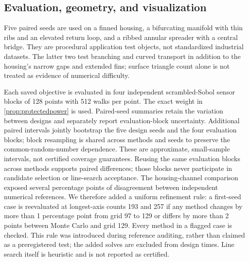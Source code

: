 \subsection{Evaluation, geometry, and visualization}
Five paired seeds are used on a finned housing, a bifurcating manifold with
thin ribs and an elevated return loop, and a ribbed annular spreader with a
central bridge. They are procedural application test objects, not standardized
industrial datasets. The latter two test branching and curved transport in
addition to the housing's narrow gaps and extended fins; surface triangle count
alone is not treated as evidence of numerical difficulty.

Each saved objective is evaluated in four independent scrambled-Sobol sensor
blocks of 128 points with 512 walks per point. The exact weight in
\cref{prop:protectedpower} is used. Paired-seed summaries retain the variation
between designs and separately report evaluation-block uncertainty. Additional
paired intervals jointly bootstrap the five design seeds and the four evaluation
blocks; block resampling is shared across methods and seeds to preserve the
common-random-number dependence. These are approximate, small-sample intervals,
not certified coverage guarantees. Reusing
the same evaluation blocks across methods supports paired differences; those
blocks never participate in candidate selection or line-search acceptance.
The housing-channel comparison exposed several percentage points of disagreement
between independent numerical references. We therefore added a uniform refinement
rule: a first-seed case is reevaluated at longest-axis counts 193 and 257 if any
method changes by more than 1 percentage point from grid 97 to 129 or differs
by more than 2 points between Monte Carlo and grid 129. Every method in a flagged
case is checked. This rule was introduced during reference auditing, rather than
claimed as a preregistered test; the added solves are excluded from design times.
Line search itself is heuristic and is not reported as certified.

